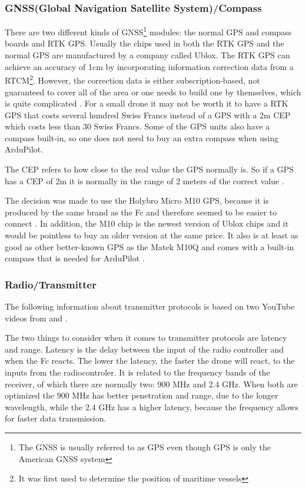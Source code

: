 \documentclass[svgnames]{article}
\begin{document}
	\subsubsection{GNSS(Global Navigation Satellite System)/Compass}
	There are two different kinds of \gls{GNSS}\footnote{The \gls{GNSS} is usually referred to as \gls{GPS} even though \gls{GPS} is only the American \gls{GNSS} system} modules: the normal \gls{GPS} and compass boards and \gls{RTK} \gls{GPS}. Usually the chips used in both the RTK GPS and the normal GPS are manufactured by a company called Ublox. The RTK GPS can achieve an accuracy of 1cm by incorporating information correction data from a \gls{RTCM}\footnote{It was first used to determine the position of maritime vessels}. However, the correction data is either subscription-based, not guaranteed to cover all of the area or one needs to build one by themselves, which is quite complicated \cite{rtkgps}. For a small drone it may not be worth it to have a \gls{RTK} \gls{GPS} that costs several hundred Swiss Francs instead of a \gls{GPS} with a 2m \gls{CEP} which costs less than 30 Swiss Francs. Some of the \gls{GPS} units also have a compass built-in, so one does not need to buy an extra compass when using ArduPilot. 
	\begin{Explanation}
		\item The \gls{CEP} refers to how close to the real value the \gls{GPS} normally is. So if a \gls{GPS} has a \gls{CEP}
		of 2m it is normally in the range of 2 meters of the correct value \cite{CEP}.
	\end{Explanation}
	
	The decision was made to use the Holybro Micro M10 \gls{GPS}, because it is produced by the same brand as the Fc and therefore seemed to be easier to connect \cite{holybrom10micro}. In addition, the M10 chip is the newest version of Ublox chips and it would be pointless to buy an older version at the same price. It also is at least as good as other better-known GPS as the Matek M10Q and comes with a built-in compass that is needed for ArduPilot \cite{gpstest}.

	\subsubsection{Radio/Transmitter}
	The following information about transmitter protocols is based on two YouTube videos from \textcite{transprotocols} and \textcite{mlrs}.
	
	The two things to consider when it comes to transmitter protocols are latency and range. Latency is the delay between the input of the radio controller and when the \gls{Fc} reacts. The lower the latency, the faster the drone will react, to the inputs from the radiocontroler. It is related to the frequency bands of the receiver, of which there are normally two: 900 MHz and 2.4 GHz. When both are optimized the 900 MHz has better penetration and range, due to the longer wavelength, while the 2.4 GHz has a higher latency, because the frequency allows for faster data transmission.
\end{document}
